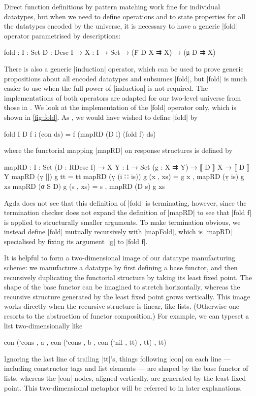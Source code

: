Direct function definitions by pattern matching work fine for individual datatypes, but when we need to define operations and to state properties for all the datatypes encoded by the universe, it is necessary to have a generic |fold| operator parametrised by descriptions:
\begin{code}
fold :  {I : Set} {D : Desc I} →
        {X : I → Set} → (Ḟ D X ⇉ X) → (μ D ⇉ X)
\end{code}
There is also a generic |induction| operator, which can be used to prove generic propositions about all encoded datatypes and subsumes |fold|, but |fold| is much easier to use when the full power of |induction| is not required.
The implementations of both operators are adapted for our two-level universe from those in .
We look at the implementation of the |fold| operator only, which is shown in \autoref{fig:fold}.
As \citeauthor{McBride-ornaments}, we would have wished to define |fold| by
\begin{code}
fold {I} {D} f {i} (con ds) = f (mapRD (D i) (fold f) ds)
\end{code}
where the functorial mapping |mapRD| on response structures is defined by
\begin{code}
mapRD :  {I : Set} (D : RDesc I) →
         {X Y : I → Set} (g : X ⇉ Y) → ⟦ D ⟧ X → ⟦ D ⟧ Y
mapRD (ṿ [])        g tt        = tt
mapRD (ṿ (i ∷ is))  g (x , xs)  = g x , mapRD (ṿ is) g xs
mapRD (σ S D)       g (s , xs)  = s , mapRD (D s) g xs
\end{code}
Agda does not see that this definition of |fold| is terminating, however, since the termination checker does not expand the definition of |mapRD| to see that |fold f| is applied to structurally smaller arguments.
To make termination obvious, we instead define |fold| mutually recursively with |mapFold|, which is |mapRD| specialised by fixing its argument~|g| to |fold f|.

It is helpful to form a two-dimensional image of our datatype manufacturing scheme:
we manufacture a datatype by first defining a base functor, and then recursively duplicating the functorial structure by taking its least fixed point.
The shape of the base functor can be imagined to stretch horizontally, whereas the recursive structure generated by the least fixed point grows vertically.
This image works directly when the recursive structure is linear, like lists.
(Otherwise one resorts to the abstraction of functor composition.)
For example, we can typeset a list two-dimensionally like
\begin{code}
con (`cons  , a  ,
con (`cons  , b  ,
con (`nil   ,
      tt) , tt) , tt)
\end{code}
Ignoring the last line of trailing |tt|'s, things following |con| on each line --- including constructor tags and list elements --- are shaped by the base functor of lists, whereas the |con| nodes, aligned vertically, are generated by the least fixed point.
This two-dimensional metaphor will be referred to in later explanations.

